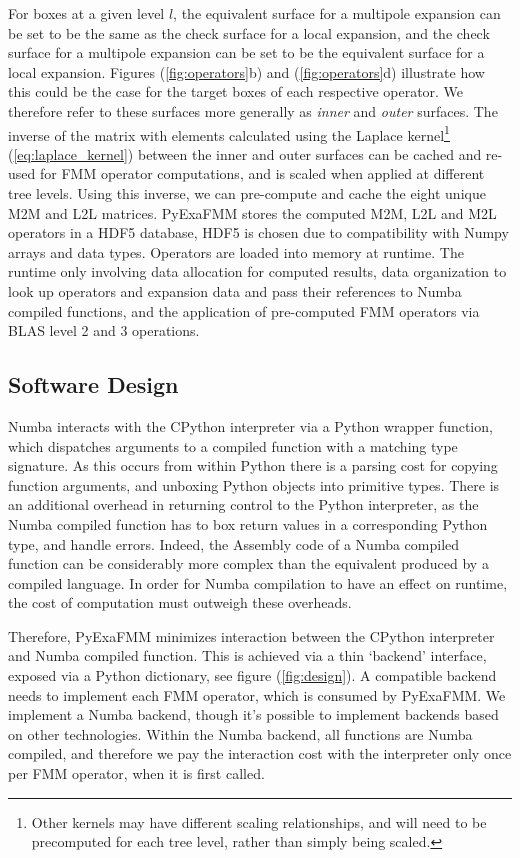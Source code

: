 \documentclass{IEEEcsmag}
\begin{document}
For boxes at a given level $l$, the equivalent surface for a multipole expansion can be set to be the same as the check surface for a local expansion, and the check surface for a multipole expansion can be set to be the equivalent surface for a local expansion. Figures (\ref{fig:operators}b) and (\ref{fig:operators}d) illustrate how this could be the case for the target boxes of each respective operator. We therefore refer to these surfaces more generally as \textit{inner} and \textit{outer} surfaces. The inverse of the matrix with elements calculated using the Laplace kernel\footnote{Other kernels may have different scaling relationships, and will need to be precomputed for each tree level, rather than simply being scaled.} (\ref{eq:laplace_kernel}) between the inner and outer surfaces can be cached and re-used for FMM operator computations, and is scaled when applied at different tree levels. Using this inverse, we can pre-compute and cache the eight unique M2M and L2L matrices. PyExaFMM stores the computed M2M, L2L and M2L operators in a HDF5 database, HDF5 is chosen due to compatibility with Numpy arrays and data types. Operators are loaded into memory at runtime. The runtime only involving data allocation for computed results, data organization to look up operators and expansion data and pass their references to Numba compiled functions, and the application of pre-computed FMM operators via BLAS level 2 and 3 operations.

\subsection{Software Design}

Numba interacts with the CPython interpreter via a Python wrapper function, which dispatches arguments to a compiled function with a matching type signature. As this occurs from within  Python there is a parsing cost for copying function arguments, and unboxing Python objects into primitive types. There is an additional overhead in returning control to the Python interpreter, as the Numba compiled function has to box return values in a corresponding Python type, and handle errors. Indeed, the Assembly code of a Numba compiled function can be considerably more complex than the equivalent produced by a compiled language. In order for Numba compilation to have an effect on runtime, the cost of computation must outweigh these overheads.

Therefore, PyExaFMM minimizes interaction between the CPython interpreter and Numba compiled function. This is achieved via a thin `backend' interface, exposed via a Python dictionary, see figure (\ref{fig:design}). A compatible backend needs to implement each FMM operator, which is consumed by PyExaFMM. We implement a Numba backend, though it's possible to implement backends based on other technologies. Within the Numba backend, all functions are Numba compiled, and therefore we pay the interaction cost with the interpreter only once per FMM operator, when it is first called.
\end{document}
